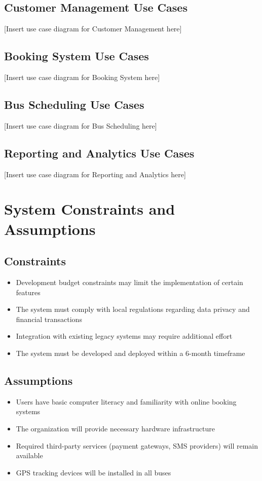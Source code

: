 \documentclass[12pt,a4paper]{report}
\begin{document}
\section{Customer Management Use Cases}
[Insert use case diagram for Customer Management here]

\section{Booking System Use Cases}
[Insert use case diagram for Booking System here]

\section{Bus Scheduling Use Cases}
[Insert use case diagram for Bus Scheduling here]

\section{Reporting and Analytics Use Cases}
[Insert use case diagram for Reporting and Analytics here]

\chapter{System Constraints and Assumptions}

\section{Constraints}
\begin{itemize}
    \item Development budget constraints may limit the implementation of certain features
    \item The system must comply with local regulations regarding data privacy and financial transactions
    \item Integration with existing legacy systems may require additional effort
    \item The system must be developed and deployed within a 6-month timeframe
\end{itemize}

\section{Assumptions}
\begin{itemize}
    \item Users have basic computer literacy and familiarity with online booking systems
    \item The organization will provide necessary hardware infrastructure
    \item Required third-party services (payment gateways, SMS providers) will remain available
    \item GPS tracking devices will be installed in all buses
\end{itemize}
\end{document}
